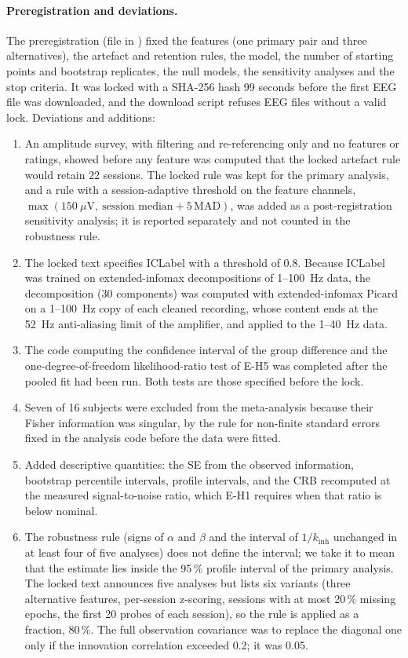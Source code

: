 \documentclass[12pt,a4paper]{article}
\theoremstyle{plain}
\theoremstyle{definition}
\theoremstyle{remark}
\newcommand{\kinh}{k_{\mathrm{inh}}}
\begin{document}
\paragraph{Preregistration and deviations.} The preregistration (file  in ) fixed the features (one primary pair and three alternatives), the artefact and retention rules, the model, the number of starting points and bootstrap replicates, the null models, the sensitivity analyses and the stop criteria. It was locked with a SHA-256 hash 99 seconds before the first EEG file was downloaded, and the download script refuses EEG files without a valid lock. Deviations and additions:
\begin{enumerate}[label=(\roman*)]
  \item An amplitude survey, with filtering and re-referencing only and no features or ratings, showed before any feature was computed that the locked artefact rule would retain 22 sessions. The locked rule was kept for the primary analysis, and a rule with a session-adaptive threshold on the feature channels, $\max(150~\mu\mathrm V,\ \text{session median}+5\,\mathrm{MAD})$, was added as a post-registration sensitivity analysis; it is reported separately and not counted in the robustness rule.
  \item The locked text specifies ICLabel with a threshold of 0.8. Because ICLabel was trained on extended-infomax decompositions of 1--100~Hz data, the decomposition (30 components) was computed with extended-infomax Picard on a 1--100~Hz copy of each cleaned recording, whose content ends at the 52~Hz anti-aliasing limit of the amplifier, and applied to the 1--40~Hz data.
  \item The code computing the confidence interval of the group difference and the one-degree-of-freedom likelihood-ratio test of E-H5 was completed after the pooled fit had been run. Both tests are those specified before the lock.
  \item Seven of 16 subjects were excluded from the meta-analysis because their Fisher information was singular, by the rule for non-finite standard errors fixed in the analysis code before the data were fitted.
  \item Added descriptive quantities: the SE from the observed information, bootstrap percentile intervals, profile intervals, and the CRB recomputed at the measured signal-to-noise ratio, which E-H1 requires when that ratio is below nominal.
  \item The robustness rule (signs of $\alpha$ and $\beta$ and the interval of $1/\kinh$ unchanged in at least four of five analyses) does not define the interval; we take it to mean that the estimate lies inside the 95\,\% profile interval of the primary analysis. The locked text announces five analyses but lists six variants (three alternative features, per-session z-scoring, sessions with at most 20\,\% missing epochs, the first 20 probes of each session), so the rule is applied as a fraction, 80\,\%. The full observation covariance was to replace the diagonal one only if the innovation correlation exceeded 0.2; it was 0.05.

\end{enumerate}
\end{document}
